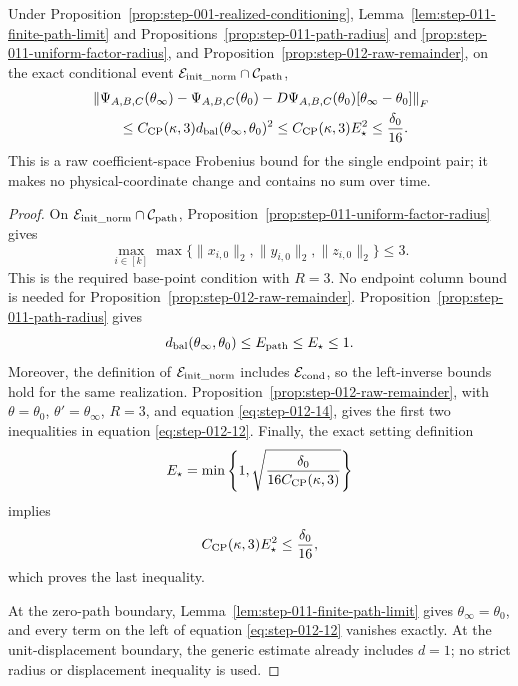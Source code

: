 \begin{proposition}
\label{prop:step-012-endpoint-remainder}
Under Proposition~\ref{prop:step-001-realized-conditioning},
Lemma~\ref{lem:step-011-finite-path-limit} and
Propositions~\ref{prop:step-011-path-radius} and
\ref{prop:step-011-uniform-factor-radius}, and
Proposition~\ref{prop:step-012-raw-remainder}, on the exact conditional event
\(\mathcal E_{\rm init\_norm}\cap\mathcal C_{\rm path}\),
\begin{equation}
\begin{aligned}
  &\left\|\Psi_{A,B,C}(\theta_\infty)
      -\Psi_{A,B,C}(\theta_0)
      -D\Psi_{A,B,C}(\theta_0)[\theta_\infty-\theta_0]
    \right\|_F\\
  &\qquad\le C_{\rm CP}(\kappa,3)
      d_{\rm bal}(\theta_\infty,\theta_0)^2
   \le C_{\rm CP}(\kappa,3)E_\star^2
   \le\frac{\delta_0}{16}.
\end{aligned}\label{eq:step-012-12}
\end{equation}
This is a raw coefficient-space Frobenius bound for the single endpoint
pair; it makes no physical-coordinate change and contains no sum over time.

\end{proposition}

\begin{proof}
On
\(\mathcal E_{\rm init\_norm}\cap\mathcal C_{\rm path}\), Proposition~\ref{prop:step-011-uniform-factor-radius} gives
\begin{equation}
  \max_{i\in[k]}
  \max\{\|x_{i,0}\|_2,\|y_{i,0}\|_2,\|z_{i,0}\|_2\}
  \le3.                                                    \label{eq:step-012-13}
\end{equation}
This is the required base-point condition with \(R=3\). No endpoint column
bound is needed for Proposition~\ref{prop:step-012-raw-remainder}.
Proposition~\ref{prop:step-011-path-radius} gives
\begin{equation}
  d_{\rm bal}(\theta_\infty,\theta_0)
  \le E_{\rm path}\le E_\star\le1.                       \label{eq:step-012-14}
\end{equation}
Moreover, the definition of \(\mathcal E_{\rm init\_norm}\) includes
\(\mathcal E_{\rm cond}\), so the left-inverse bounds hold for the
same realization. Proposition~\ref{prop:step-012-raw-remainder}, with
\(\theta=\theta_0\), \(\theta'=\theta_\infty\), \(R=3\), and equation
\eqref{eq:step-012-14}, gives the first two inequalities in equation \eqref{eq:step-012-12}. Finally, the exact
setting definition
\[
  E_\star
  =\min\left\{1,
       \sqrt{\frac{\delta_0}{16C_{\rm CP}(\kappa,3)}}
    \right\}
\]
implies
\[
  C_{\rm CP}(\kappa,3)E_\star^2\le\frac{\delta_0}{16},
\]
which proves the last inequality.

At the zero-path boundary,
Lemma~\ref{lem:step-011-finite-path-limit} gives
\(\theta_\infty=\theta_0\), and every term on the left of equation \eqref{eq:step-012-12}
vanishes exactly. At the unit-displacement boundary, the generic estimate
already includes \(d=1\); no strict radius or displacement inequality is
used. 

\end{proof}

